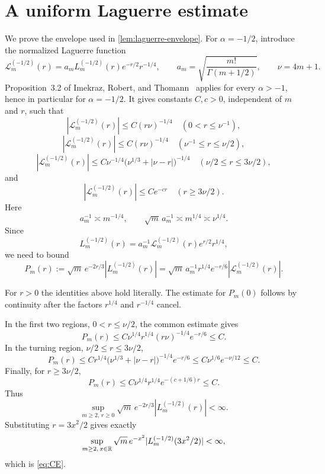 \section{A uniform Laguerre estimate}\label{app:laguerre}

We prove the envelope used in \cref{lem:laguerre-envelope}. For $\alpha=-1/2$, introduce the normalized Laguerre function
\[
\mathcal L_m^{(-1/2)}(r)
 =a_mL_m^{(-1/2)}(r)e^{-r/2}r^{-1/4},
\qquad
a_m=\sqrt{\frac{m!}{\Gamma(m+1/2)}},
\qquad
\nu=4m+1.
\]
Proposition~3.2 of Imekraz, Robert, and Thomann~\cite{ImekrazRobertThomann2016} applies for every $\alpha>-1$, hence in particular for $\alpha=-1/2$. It gives constants $C,c>0$, independent of $m$ and $r$, such that
\[
|\mathcal L_m^{(-1/2)}(r)|\le C(r\nu)^{-1/4}
\quad (0<r\le\nu^{-1}),
\]
\[
|\mathcal L_m^{(-1/2)}(r)|\le C(r\nu)^{-1/4}
\quad (\nu^{-1}\le r\le\nu/2),
\]
\[
|\mathcal L_m^{(-1/2)}(r)|
 \le C\nu^{-1/4}\bigl(\nu^{1/3}+|\nu-r|\bigr)^{-1/4}
 \quad (\nu/2\le r\le3\nu/2),
\]
and
\[
|\mathcal L_m^{(-1/2)}(r)|\le Ce^{-cr}
\quad (r\ge3\nu/2).
\]
Here
\[
a_m^{-1}\asymp m^{-1/4},
\qquad
\sqrt m\,a_m^{-1}\asymp m^{1/4}\asymp\nu^{1/4}.
\]
Since
\[
L_m^{(-1/2)}(r)
=a_m^{-1}\mathcal L_m^{(-1/2)}(r)e^{r/2}r^{1/4},
\]
we need to bound
\[
P_m(r):=\sqrt m\,e^{-2r/3}|L_m^{(-1/2)}(r)|
=\sqrt m\,a_m^{-1}r^{1/4}e^{-r/6}
 |\mathcal L_m^{(-1/2)}(r)|.
\]

For $r>0$ the identities above hold literally. The estimate for $P_m(0)$ follows by continuity after the factors $r^{1/4}$ and $r^{-1/4}$ cancel.

In the first two regions, $0<r\le\nu/2$, the common estimate gives
\[
P_m(r)
\le C\nu^{1/4}r^{1/4}(r\nu)^{-1/4}e^{-r/6}
\le C.
\]
In the turning region, $\nu/2\le r\le3\nu/2$,
\[
P_m(r)
\le C r^{1/4}\bigl(\nu^{1/3}+|\nu-r|\bigr)^{-1/4}e^{-r/6}
\le C\nu^{1/6}e^{-\nu/12}
\le C.
\]
Finally, for $r\ge3\nu/2$,
\[
P_m(r)
\le C\nu^{1/4}r^{1/4}e^{-(c+1/6)r}
\le C.
\]
Thus
\[
\sup_{m\ge2,\,r\ge0}\sqrt m\,e^{-2r/3}|L_m^{(-1/2)}(r)|<\infty.
\]
Substituting $r=3x^2/2$ gives exactly
\[
\sup_{m\ge2,\,x\in\mathbb R}
\sqrt m\,e^{-x^2}|L_m^{(-1/2)}(3x^2/2)|<\infty,
\]
which is \eqref{eq:CE}.
